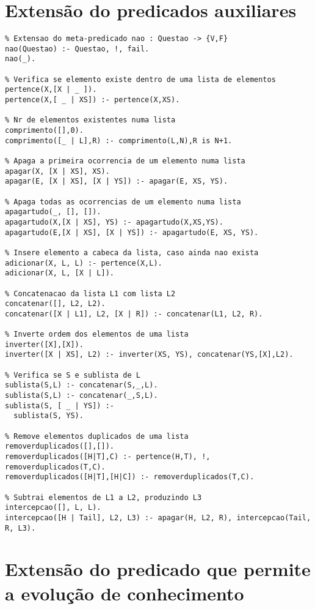 \documentclass[
  oneside,
  10pt, a4paper,
  footinclude=true,
  headinclude=true,
  cleardoublepage=empty
]{scrbook}
\begin{document}
\section{Extensão do predicados auxiliares}
	\label{predicados_aux}
	\begin{lstlisting}	
% Extensao do meta-predicado nao : Questao -> {V,F}
nao(Questao) :- Questao, !, fail.
nao(_).

% Verifica se elemento existe dentro de uma lista de elementos
pertence(X,[X | _ ]).
pertence(X,[ _ | XS]) :- pertence(X,XS).

% Nr de elementos existentes numa lista 
comprimento([],0).
comprimento([_ | L],R) :- comprimento(L,N),R is N+1.

% Apaga a primeira ocorrencia de um elemento numa lista
apagar(X, [X | XS], XS).
apagar(E, [X | XS], [X | YS]) :- apagar(E, XS, YS).

% Apaga todas as ocorrencias de um elemento numa lista
apagartudo(_, [], []).
apagartudo(X,[X | XS], YS) :- apagartudo(X,XS,YS).
apagartudo(E,[X | XS], [X | YS]) :- apagartudo(E, XS, YS).

% Insere elemento a cabeca da lista, caso ainda nao exista
adicionar(X, L, L) :- pertence(X,L).
adicionar(X, L, [X | L]).

% Concatenacao da lista L1 com lista L2
concatenar([], L2, L2).
concatenar([X | L1], L2, [X | R]) :- concatenar(L1, L2, R).

% Inverte ordem dos elementos de uma lista
inverter([X],[X]).
inverter([X | XS], L2) :- inverter(XS, YS), concatenar(YS,[X],L2).

% Verifica se S e sublista de L
sublista(S,L) :- concatenar(S,_,L).
sublista(S,L) :- concatenar(_,S,L).
sublista(S, [ _ | YS]) :- 
  sublista(S, YS).

% Remove elementos duplicados de uma lista
removerduplicados([],[]).
removerduplicados([H|T],C) :- pertence(H,T), !, removerduplicados(T,C).
removerduplicados([H|T],[H|C]) :- removerduplicados(T,C).

% Subtrai elementos de L1 a L2, produzindo L3
intercepcao([], L, L).
intercepcao([H | Tail], L2, L3) :- apagar(H, L2, R), intercepcao(Tail, R, L3).
\end{lstlisting}

	\section{Extensão do predicado que permite a evolução de conhecimento}
	\label{evolucao_anexo}
\end{document}
